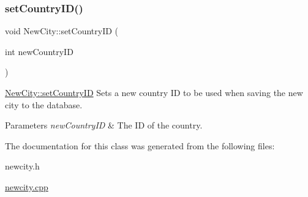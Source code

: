 \subsubsection{\texorpdfstring{set\+Country\+I\+D()}{setCountryID()}}
{\footnotesize\ttfamily void New\+City\+::set\+Country\+ID (\begin{DoxyParamCaption}\item[{int}]{new\+Country\+ID }\end{DoxyParamCaption})}



\hyperlink{class_new_city_a8a96f2c58640c96faf74e1f3bb956e4e}{New\+City\+::set\+Country\+ID} Sets a new country ID to be used when saving the new city to the database. 


\begin{DoxyParams}{Parameters}
{\em new\+Country\+ID} & The ID of the country. \\
\hline
\end{DoxyParams}


The documentation for this class was generated from the following files\+:\begin{DoxyCompactItemize}
\item 
newcity.\+h\item 
\hyperlink{newcity_8cpp}{newcity.\+cpp}\end{DoxyCompactItemize}
